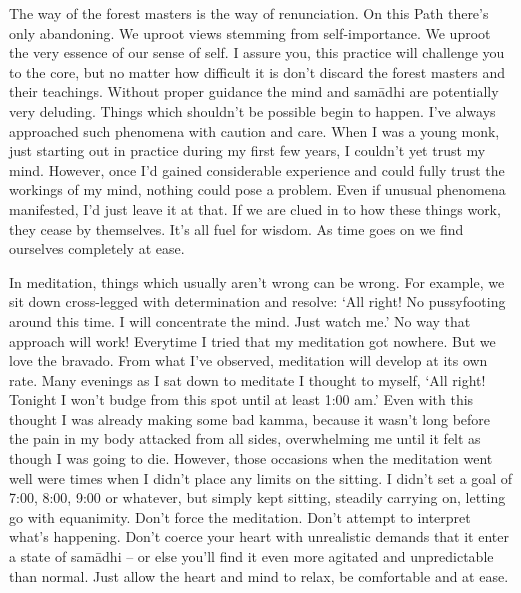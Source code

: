 The way of the forest masters is the way of renunciation. On this Path there's only abandoning. We uproot views stemming from self-importance. We uproot the very essence of our sense of self. I assure you, this practice will challenge you to the core, but no matter how difficult it is don't discard the forest masters and their teachings. Without proper guidance the mind and sam\=adhi are potentially very deluding. Things which shouldn't be possible begin to happen. I've always approached such phenomena with caution and care. When I was a young monk, just starting out in practice during my first few years, I couldn't yet trust my mind. However, once I'd gained considerable experience and could fully trust the workings of my mind, nothing could pose a problem. Even if unusual phenomena manifested, I'd just leave it at that. If we are clued in to how these things work, they cease by themselves. It's all fuel for wisdom. As time goes on we find ourselves completely at ease.

In meditation, things which usually aren't wrong can be wrong. For example, we sit down cross-legged with determination and resolve: `All right! No pussyfooting around this time. I will concentrate the mind. Just watch me.' No way that approach will work! Everytime I tried that my meditation got nowhere. But we love the bravado. From what I've observed, meditation will develop at its own rate. Many evenings as I sat down to meditate I thought to myself, `All right! Tonight I won't budge from this spot until at least 1:00 am.' Even with this thought I was already making some bad kamma, because it wasn't long before the pain in my body attacked from all sides, overwhelming me until it felt as though I was going to die. However, those occasions when the meditation went well were times when I didn't place any limits on the sitting. I didn't set a goal of 7:00, 8:00, 9:00 or whatever, but simply kept sitting, steadily carrying on, letting go with equanimity. Don't force the meditation. Don't attempt to interpret what's happening. Don't coerce your heart with unrealistic demands that it enter a state of sam\=adhi -- or else you'll find it even more agitated and unpredictable than normal. Just allow the heart and mind to relax, be comfortable and at ease.


